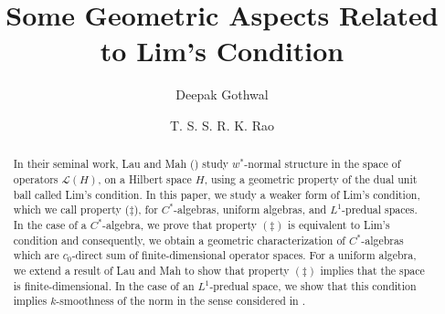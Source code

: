 \documentclass[11pt]{amsart}
\begin{document}
\large
\title[Geometry]{Some Geometric Aspects Related to Lim's Condition}
\author[Gothwal]{Deepak Gothwal}
\address[Deepak Gothwal]
{Department of Mathematics\\
Indian Institute of Technology, Kharagpur\\
West Bengal-721302\\ India,
\textit{E-mail~:}
\textit{deepakgothwal190496@gmail.com}}
\author[Rao]{T. S. S. R. K. Rao}
\address[T. S. S. R. K. Rao]
{Department of Mathematics\\
Shiv Nadar Institution of Eminence \\
Gautam Buddha Nagar\\ UP-201314 \\ India,
\textit{E-mail~:}
\textit{srin@fulbrightmail.org}}
\begin{abstract}
 In  their seminal work, Lau and Mah (\cite{LM}) study $w^*$-normal structure in the space of operators $\mathcal{L}(H)$, on a Hilbert space $H$, using a geometric property of the dual unit ball called Lim's condition. In this paper, we study a weaker form of Lim's condition, which we call property ($\ddagger$), for $C^\ast$-algebras, uniform algebras, and $L^1$-predual spaces. In the case of a $C^\ast$-algebra, we prove that property $(\ddagger)$ is equivalent to Lim's condition and consequently, we obtain a geometric characterization of $C^*$-algebras which are $c_0$-direct sum of finite-dimensional operator spaces. For a uniform algebra, we extend a result of Lau and Mah to show that property $(\ddagger)$ implies that the space is finite-dimensional. In the case of an $L^1$-predual space, we show that this condition implies $k$-smoothness of the norm in the sense considered in \cite{LR}.
\end{abstract}

\maketitle
\end{document}
